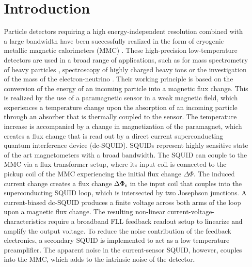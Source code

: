 \chapter{Introduction}

Particle detectors requiring a high energy-independent resolution combined with a large bandwidth have been successfully realized in the form of cryogenic metallic magnetic calorimeters (MMC) \cite{Enss2005a}. These high-precision low-temperature detectors are used in a broad range of applications, such as for mass spectrometry of heavy particles \cite{Hengstler2017}, spectroscopy of highly charged heavy ions \cite{Gamer2919} or the investigation of the mass of the electron-neutrino \cite{Gastaldo2017}. Their working principle is based on the conversion of the energy of an incoming particle into a magnetic flux change. This is realized by the use of a paramagnetic sensor in a weak magnetic field, which experiences a temperature change upon the absorption of an incoming particle through an absorber that is thermally coupled to the sensor. The temperature increase is accompanied by a change in magnetization of the paramagnet, which creates a flux change that is read out by a direct current superconducting quantum interference device (dc-SQUID). SQUIDs represent highly sensitive state of the art magnetometers with a broad bandwidth. The SQUID can couple to the MMC via a flux transformer setup, where its input coil is connected to the pickup coil of the MMC experiencing the initial flux change $\Delta\Phi$. The induced current change creates a flux change $\Delta\Phi_{\rm s}$ in the input coil that couples into the superconducting SQUID loop, which is intersected by two Josephson junctions. A current-biased dc-SQUID produces a finite voltage across both arms of the loop upon a magnetic flux change. The resulting non-linear current-voltage-characteristics require a broadband FLL feedback readout setup to linearize and amplify the output voltage. To reduce the noise contribution of the feedback electronics, a secondary SQUID is implemented to act as a low temperature preamplifier. The apparent noise in the current-sensor SQUID, however, couples into the MMC, which adds to the intrinsic noise of the detector. 


